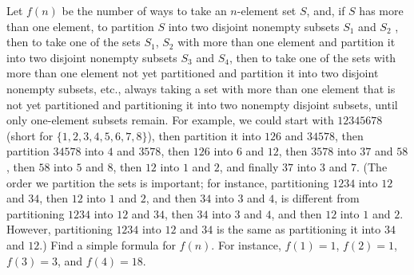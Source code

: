 Let $f(n)$ be the number of ways to take an $n$-element set $S$, and, if $S$ has more than one element, to partition $S$ into two disjoint nonempty subsets $S_1$ and $S_2$ , then to take one of the sets $S_1$, $S_2$ with more than one element and partition it into two disjoint nonempty subsets $S_3$ and $S_4$, then to take one of the sets with more than one element not yet partitioned and partition it into two disjoint nonempty subsets, etc., always taking a set with more than one element that is not yet partitioned and partitioning it into two nonempty disjoint subsets, until only one-element subsets remain.
For example, we could start with $12345678$ (short for $\{1, 2, 3, 4, 5, 6, 7, 8\}$), then partition it into $126$ and $34578$, then partition $34578$ into $4$ and $3578$, then $126$ into $6$ and $12$, then $3578$ into $37$ and $58$, then $58$ into $5$ and $8$, then $12$ into $1$ and $2$, and finally $37$ into $3$ and $7$.
(The order we partition the sets is important; for instance, partitioning $1234$ into $12$ and $34$, then $12$ into $1$ and $2$, and then $34$ into $3$ and $4$, is different from partitioning $1234$ into $12$ and $34$, then $34$ into $3$ and $4$, and then $12$ into $1$ and $2$.
However, partitioning $1234$ into $12$ and $34$ is the same as partitioning it into $34$ and $12$.)
Find a simple formula for $f(n)$. For instance, $f(1) = 1$, $f(2) = 1$, $f(3) = 3$, and $f (4) = 18$.
